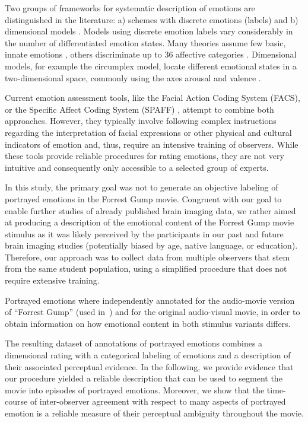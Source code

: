 Two groups of frameworks for systematic description of emotions are
distinguished in the literature: a) schemes with discrete emotions (labels) and
b) dimensional models \cite{GW2007}.  Models using discrete emotion labels vary
considerably in the number of differentiated emotion states. Many theories
assume few basic, innate emotions \cite{Ekm1992a}, others discriminate up to
36 affective categories \cite{Sch2005}.  Dimensional models, for example the
circumplex model, locate different emotional states in a two-dimensional
space, commonly using the axes arousal and valence \cite{Rus1980}.

Current emotion assessment tools, like the Facial Action Coding System (FACS),
or the Specific Affect Coding System (SPAFF) \cite{CG2007}, attempt to combine
both approaches. However, they typically involve following complex instructions
regarding the interpretation of facial expressions or other physical and
cultural indicators of emotion \cite[p. 281]{CG2007} and, thus, require an
intensive training of observers. While these tools provide reliable procedures
for rating emotions, they are not very intuitive and consequently only
accessible to a selected group of experts. 

In this study, the primary goal was not to generate an objective labeling of
portrayed emotions in the Forrest Gump movie.  Congruent with our goal to
enable further studies of already published brain imaging data, we rather aimed
at producing a description of the emotional content of the Forrest Gump movie
stimulus as it was likely perceived by the participants in our past and future
brain imaging studies (potentially biased by age, native language, or
education). Therefore, our approach was to collect data from multiple observers
that stem from the same student population, using a simplified procedure
that does not require extensive training.

Portrayed emotions where independently annotated for the audio-movie version of
``Forrest Gump'' (used in~\cite{HBI+14}) and for the original audio-visual
movie, in order to obtain information on how emotional content in both stimulus
variants differs.

The resulting dataset of annotations of portrayed emotions combines a
dimensional rating with a categorical labeling of emotions and a description of
their associated perceptual evidence. In the following, we provide evidence
that our procedure yielded a reliable description that can be used to segment
the movie into episodes of portrayed emotions. Moreover, we show that the
time-course of inter-observer agreement with respect to many aspects of
portrayed emotion is a reliable measure of their perceptual ambiguity
throughout the movie.

